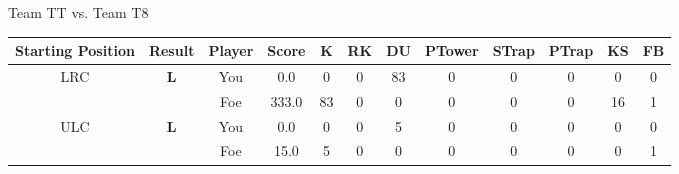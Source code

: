 \documentclass[a4paper,12pt]{article}
\begin{document}
  \vspace*{2em}
  \par {\large {\color{Gray} Team} TT {\color{Gray}
      vs. Team} T8}
  \newline
  \begin{tabular}[t]{| c | c | c | c | c | c | c | c | c | c | c | c
      |}
    \hline
    Starting Position & \textbf{Result} & Player & \textbf{Score} & K & RK & DU & PTower & STrap & PTrap & KS & FB \\
    
      
                      
      
                      
      
        \hline
        \multirow{2}{*}{  LRC
             } &
              \multirow{2}{*}{  \textbf{L}  } & 
                    \cellcolor{yellow!25} You & \cellcolor{yellow!25} 0.0 & \cellcolor{yellow!25} 0 &
                    \cellcolor{yellow!25} 0 & \cellcolor{yellow!25} 83 & \cellcolor{yellow!25} 0 &
                    \cellcolor{yellow!25} 0 & \cellcolor{yellow!25} 0 & \cellcolor{yellow!25} 0 &
                    \cellcolor{yellow!25} 0 \\
                    \cline{3-12}
                    & & \cellcolor{red!15} Foe & \cellcolor{red!15} 333.0 & \cellcolor{red!15} 83 & \cellcolor{red!15}
                    0 & \cellcolor{red!15} 0
                    & \cellcolor{red!15} 0 & \cellcolor{red!15}
                    0 & \cellcolor{red!15} 0 
                    & \cellcolor{red!15} 16 & \cellcolor{red!15}
                    1 \\
                    
                      
      
                      
      
                      
      
                      
      
                      
      
        \hline
        \multirow{2}{*}{  ULC  } &
              \multirow{2}{*}{  \textbf{L}  } & 
                    \cellcolor{yellow!25} You & \cellcolor{yellow!25} 0.0 & \cellcolor{yellow!25} 0 &
                    \cellcolor{yellow!25} 0 & \cellcolor{yellow!25} 5 & \cellcolor{yellow!25} 0 &
                    \cellcolor{yellow!25} 0 & \cellcolor{yellow!25} 0 & \cellcolor{yellow!25} 0 &
                    \cellcolor{yellow!25} 0 \\
                    \cline{3-12}
                    & & \cellcolor{red!15} Foe & \cellcolor{red!15} 15.0 & \cellcolor{red!15} 5 & \cellcolor{red!15}
                    0 & \cellcolor{red!15} 0
                    & \cellcolor{red!15} 0 & \cellcolor{red!15}
                    0 & \cellcolor{red!15} 0 
                    & \cellcolor{red!15} 0 & \cellcolor{red!15}
                    1 \\
                    

\end{tabular}
\end{document}
